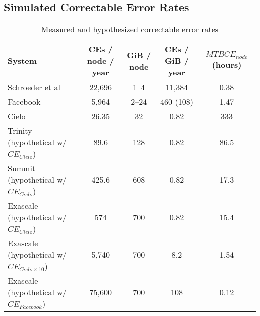 \subsection{Simulated Correctable Error Rates}



\begin{table*} 
        \centering 
        \begin{tabular}{ l c c c c } 
         \toprule
                System & CEs / node / year & GiB / node & CEs / GiB / year & $MTBCE_{node}$ (hours)\\
         \midrule
                Schroeder et al~\cite{Schroeder:09:dram}  & 22,696 & 1--4 & 11,384 & 0.38\\
                Facebook~\cite{meza:2015:revisiting} & 5,964 & 2--24 & 460 (108)& 1.47\\ %
                Cielo~\cite{levy:2018:lessons} & 26.35 & 32 & 0.82 & 333 \\ %
                Trinity~\cite{Trinity} (hypothetical w/ $CE_{Cielo}$)  &  89.6 &
                128 & 0.82 & 86.5\\   %
                Summit~\cite{Summit} (hypothetical w/ $CE_{Cielo}$)  &  425.6 &
                608 & 0.82 & 17.3\\   %
                Exascale (hypothetical w/ $CE_{Cielo}$) & 574 & 700 & 0.82 &
                15.4 \\%
                Exascale (hypothetical w/ $CE_{Cielo \times 10}$) & 5,740 & 700 &
                8.2 & 1.54 \\%
                Exascale (hypothetical w/ $CE_{Facebook}$) & 75,600 & 700 & 108 &
                0.12 \\%
         \bottomrule
        \end{tabular}
        \vspace{.6em}
        \caption{ 
                Measured and hypothesized correctable error rates
        }
        \label{tab:CE_rate}
\end{table*}

